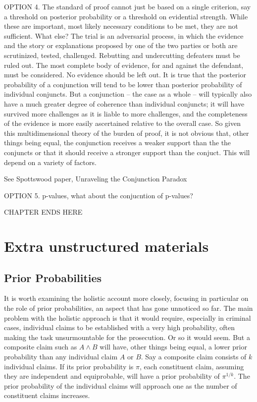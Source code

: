 \documentclass[
  10pt,
  dvipsnames,enabledeprecatedfontcommands]{scrartcl}
\begin{document}
OPTION 4. The standard of proof cannot just be based on a single
criterion, say a threshold on posterior probability or a threshold on
evidential strength. While these are important, most likely necessary
conditions to be met, they are not sufficient. What else? The trial is
an adversarial process, in which the evidence and the story or
explanations proposed by one of the two parties or both are scrutinized,
tested, challenged. Rebutting and undercutting defeaters must be ruled
out. The most complete body of evidence, for and against the defendant,
must be considered. No evidence should be left out. It is true that the
posterior probability of a conjunction will tend to be lower than
posterior probability of individual conjuncts. But a conjunction -- the
case as a whole -- will typically also have a much greater degree of
coherence than individual conjuncts; it will have survived more
challenges as it is liable to more challenges, and the completeness of
the evidence is more easily ascertained relative to the overall case. So
given this multidimensional theory of the burden of proof, it is not
obvious that, other things being equal, the conjunction receives a
weaker support than the the conjuncts or that it should receive a
stronger support than the conjuct. This will depend on a variety of
factors.

See Spottswood paper, Unraveling the Conjunction Paradox

OPTION 5. p-values, what about the conjucntion of p-values?

\noindent\makebox[\linewidth]{\rule{\paperwidth}{1pt}}

CHAPTER ENDS HERE

\noindent\makebox[\linewidth]{\rule{\paperwidth}{1pt}}

\hypertarget{extra-unstructured-materials}{%
\section{Extra unstructured
materials}\label{extra-unstructured-materials}}

\hypertarget{prior-probabilities}{%
\subsection{Prior Probabilities}\label{prior-probabilities}}

It is worth examining the holistic account more closely, focusing in
particular on the role of prior probabilities, an aspect that has gone
unnoticed so far. The main problem with the holistic approach is that it
would require, especially in criminal cases, individual claims to be
established with a very high probability, often making the task
unsurmountable for the prosecution. Or so it would seem. But a composite
claim such as \(A\wedge B\) will have, other things being equal, a lower
prior probability than any individual claim \(A\) or \(B\). Say a
composite claim consists of \(k\) individual claims. If its prior
probability is \(\pi\), each constituent claim, assuming they are
independent and equiprobable, will have a prior probability of
\(\pi^{1/k}\). The prior probability of the individual claims will
approach one as the number of constituent claims increases.
\end{document}
